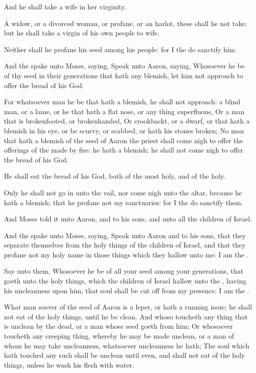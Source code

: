 \Verse And he shall take a wife in her virginity.

\Verse A widow, or a divorced woman, or profane, or an harlot, these shall he not take: but he shall take a virgin of his own people to wife.

\Verse Neither shall he profane his seed among his people: for I the \LORD do sanctify him.

\Verse And the \LORD spake unto Moses, saying, \Verse Speak unto Aaron, saying, Whosoever he be of thy seed in their generations that hath any blemish, let him not approach to offer the bread of his God.

\Verse For whatsoever man he be that hath a blemish, he shall not approach: a blind man, or a lame, or he that hath a flat nose, or any thing superfluous, \Verse Or a man that is brokenfooted, or brokenhanded, \Verse Or crookbackt, or a dwarf, or that hath a blemish in his eye, or be scurvy, or scabbed, or hath his stones broken; \Verse No man that hath a blemish of the seed of Aaron the priest shall come nigh to offer the offerings of the \LORD made by fire: he hath a blemish; he shall not come nigh to offer the bread of his God.

\Verse He shall eat the bread of his God, both of the most holy, and of the holy.

\Verse Only he shall not go in unto the vail, nor come nigh unto the altar, because he hath a blemish; that he profane not my sanctuaries: for I the \LORD do sanctify them.

\Verse And Moses told it unto Aaron, and to his sons, and unto all the children of Israel.

\Chapter
\Verse And the \LORD spake unto Moses, saying, \Verse Speak unto Aaron and to his sons, that they separate themselves from the holy things of the children of Israel, and that they profane not my holy name in those things which they hallow unto me: I am the \LORD.

\Verse Say unto them, Whosoever he be of all your seed among your generations, that goeth unto the holy things, which the children of Israel hallow unto the \LORD, having his uncleanness upon him, that soul shall be cut off from my presence: I am the \LORD.

\Verse What man soever of the seed of Aaron is a leper, or hath a running issue; he shall not eat of the holy things, until he be clean.  And whoso toucheth any thing that is unclean by the dead, or a man whose seed goeth from him; \Verse Or whosoever toucheth any creeping thing, whereby he may be made unclean, or a man of whom he may take uncleanness, whatsoever uncleanness he hath; \Verse The soul which hath touched any such shall be unclean until even, and shall not eat of the holy things, unless he wash his flesh with water.

